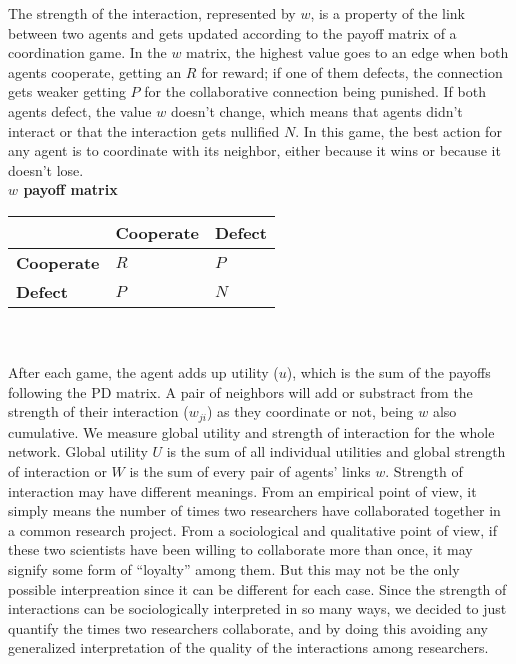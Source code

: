 \documentclass{bmcart}
\begin{document}
The strength of the interaction, represented by $w$, is a property of the link between two agents and
gets updated according to the payoff matrix of a coordination game. In the $w$ matrix, the highest value
goes to an edge when both agents cooperate, getting an $R$ for reward; if one of
them defects, the connection gets weaker getting $P$ for the collaborative
connection being punished. If both agents defect, the value $w$ doesn't change,
which means that agents didn't interact or that the interaction gets nullified
$N$. In this game, the best action for any agent is to coordinate with its
neighbor, either because it wins or because it doesn't lose. \\ 

{\bf $w$ payoff matrix}\\

\begin{tabular}{| l | l | l |}
\hline
          & \bf{Cooperate} & \bf{Defect} \\ \hline
\bf{Cooperate} &  $R$      &  $P$   \\ \hline
\bf{Defect}    &  $P$      &  $N$   \\ \hline

\end{tabular}\\ \\


After each game, the agent adds up utility ($u$), which is the sum of the
payoffs following the PD matrix. A pair of neighbors will add or substract from
the strength of their interaction ($w_{ji}$) as they coordinate or not, being
$w$ also cumulative. We measure global utility and strength of interaction for
the whole network. Global utility $U$ is the sum of all individual utilities and
global strength of interaction or $W$ is the sum of every pair of agents' links
$w$. {\color{red}Strength of interaction may have different meanings. From an empirical
point of view, it simply means the number of times two researchers have
collaborated together in a common research project. From a sociological and
qualitative point of view, if these two scientists have been willing to
collaborate more than once, it may signify some form of ``loyalty'' among them. But
this may not be the only possible interpreation since it can be different for
each case. Since the strength of interactions can be sociologically interpreted
in so many ways, we decided to just quantify the  times two researchers
collaborate, and by doing this avoiding any generalized interpretation of the
quality of the interactions among researchers.} \\ 
\end{document}
